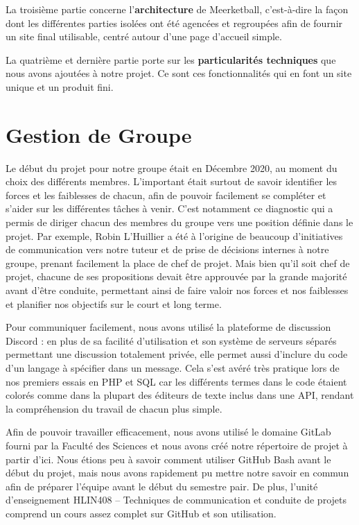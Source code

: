 \documentclass[12pt]{report}
\begin{document}
	    \bigskip
	    \par
        La troisième partie concerne l’\textbf{architecture} de Meerketball, c’est-à-dire la façon dont les différentes parties isolées ont été agencées et regroupées afin de fournir un site final utilisable, centré autour d’une page d’accueil simple.
		    
        \bigskip
        \par
        La quatrième et dernière partie porte sur les \textbf{particularités techniques} que nous avons ajoutées à notre projet. Ce sont ces fonctionnalités qui en font un site unique et un produit fini.

        \chapter{Gestion de Groupe}
        \par
        Le début du projet pour notre groupe était en Décembre 2020, au moment du choix des différents membres. L’important était surtout de savoir identifier les forces et les faiblesses de chacun, afin de pouvoir facilement se compléter et s’aider sur les différentes tâches à venir. C’est notamment ce diagnostic qui a permis de diriger chacun des membres du groupe vers une position définie dans le projet. Par exemple, Robin L’Huillier a été à l’origine de beaucoup d’initiatives de communication vers notre tuteur et de prise de décisions internes à notre groupe, prenant facilement la place de chef de projet. Mais bien qu’il soit chef de projet, chacune de ses propositions devait être approuvée par la grande majorité avant d’être conduite, permettant ainsi de faire valoir nos forces et nos faiblesses et planifier nos objectifs sur le court et long terme.
        
        \bigskip
        \par
        Pour communiquer facilement, nous avons utilisé la plateforme de discussion Discord : en plus de sa facilité d’utilisation et son système de serveurs séparés permettant une discussion totalement privée, elle permet aussi d’inclure du code d’un langage à spécifier dans un message. Cela s’est avéré très pratique lors de nos premiers essais en PHP et SQL car les différents termes dans le code étaient colorés comme dans la plupart des éditeurs de texte inclus dans une API, rendant la compréhension du travail de chacun plus simple.
        
        \bigskip
        \par
        Afin de pouvoir travailler efficacement, nous avons utilisé le domaine GitLab fourni par la Faculté des Sciences et nous avons créé notre répertoire de projet à partir d’ici. Nous étions peu à savoir comment utiliser GitHub Bash avant le début du projet, mais nous avons rapidement pu mettre notre savoir en commun afin de préparer l’équipe avant le début du semestre pair. De plus, l’unité d’enseignement HLIN408 – Techniques de communication et conduite de projets comprend un cours assez complet sur GitHub et son utilisation.
        
\end{document}
